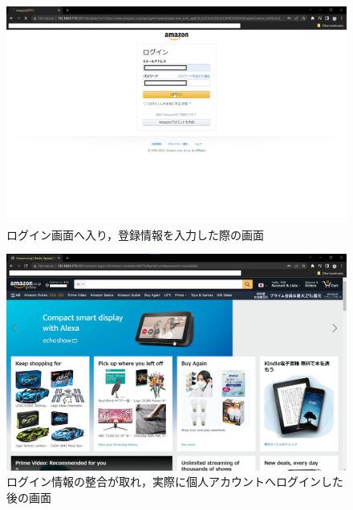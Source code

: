 \documentclass[dvipdfmx]{jsarticle}
\begin{document}
                    \begin{figure}[pth]
                        \centering
                        \includegraphics[width=15cm]{img/amazon/amazon-02.png}
                        \caption{ログイン画面へ入り，登録情報を入力した際の画面}
                        \label{amazon-02}
                    \end{figure}
                    \begin{figure}[pth]
                        \centering
                        \includegraphics[width=15cm]{img/amazon/amazon-03.png}
                        \caption{ログイン情報の整合が取れ，実際に個人アカウントへログインした後の画面}
                        \label{amazon-03}
                    \end{figure}
                    \clearpage
\end{document}
